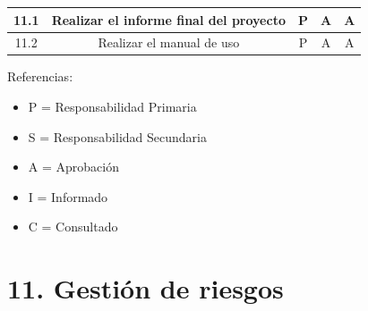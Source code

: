 \documentclass[11pt]{charter}
\begin{document}
\begin{table}[]
\begin{tabular}{|c|c|c|c|c|}
11.1                                                                                           & Realizar el informe final del proyecto                                             & P                                                                           & A                                                                  & A                                                                    \\ \hline
11.2                                                                                           & Realizar el manual de uso                                                          & P                                                                           & A                                                                  & A                                                                    \\ \hline
\end{tabular}
\end{table}
{\footnotesize
Referencias:
\begin{itemize}
	\item P = Responsabilidad Primaria
	\item S = Responsabilidad Secundaria
	\item A = Aprobación
	\item I = Informado
	\item C = Consultado
\end{itemize}
} %

\section{11. Gestión de riesgos}
\label{sec:riesgos}
\end{document}
